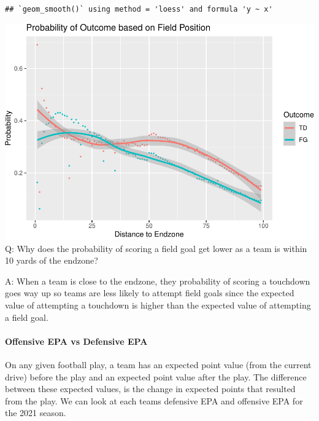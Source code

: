 \documentclass[]{article}
\let\oldparagraph\paragraph
\renewcommand{\paragraph}[1]{\oldparagraph{#1}\mbox{}}
\begin{document}
\begin{verbatim}
## `geom_smooth()` using method = 'loess' and formula 'y ~ x'
\end{verbatim}

\includegraphics{22-isaac_files/figure-latex/unnamed-chunk-11-1.pdf} Q:
Why does the probability of scoring a field goal get lower as a team is
within 10 yards of the endzone?

A: When a team is close to the endzone, they probability of scoring a
touchdown goes way up so teams are less likely to attempt field goals
since the expected value of attempting a touchdown is higher than the
expected value of attempting a field goal.

\hypertarget{offensive-epa-vs-defensive-epa}{%
\paragraph{Offensive EPA vs Defensive
EPA}\label{offensive-epa-vs-defensive-epa}}

On any given football play, a team has an expected point value (from the
current drive) before the play and an expected point value after the
play. The difference between these expected values, is the change in
expected points that resulted from the play. We can look at each teams
defensive EPA and offensive EPA for the 2021 season.
\end{document}
